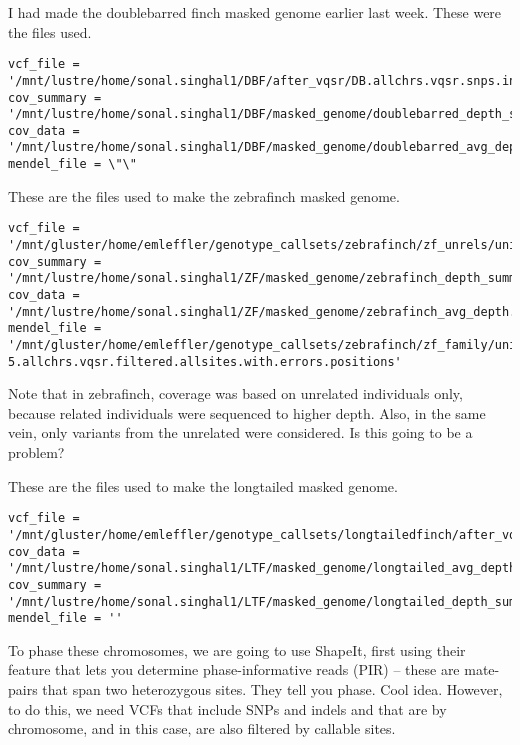\documentclass[idxtotoc,hyperref,openany,oneside]{labbook} %
\begin{document}
I had made the doublebarred finch masked genome earlier last week. These were the files used.
\begin{verbatim}
vcf_file = '/mnt/lustre/home/sonal.singhal1/DBF/after_vqsr/DB.allchrs.vqsr.snps.indels.vcf.gz'
cov_summary = '/mnt/lustre/home/sonal.singhal1/DBF/masked_genome/doublebarred_depth_summary.txt'
cov_data = '/mnt/lustre/home/sonal.singhal1/DBF/masked_genome/doublebarred_avg_depth.txt'
mendel_file = \"\"
\end{verbatim}

These are the files used to make the zebrafinch masked genome.
\begin{verbatim}
vcf_file = '/mnt/gluster/home/emleffler/genotype_callsets/zebrafinch/zf_unrels/unified_genotyper/after_vqsr/gatk.ug.unrelzf.allchrs.snps.indels.vqsr2.vcf.gz'
cov_summary = '/mnt/lustre/home/sonal.singhal1/ZF/masked_genome/zebrafinch_depth_summary.txt'
cov_data = '/mnt/lustre/home/sonal.singhal1/ZF/masked_genome/zebrafinch_avg_depth.txt'
mendel_file = '/mnt/gluster/home/emleffler/genotype_callsets/zebrafinch/zf_family/unified_genotyper/after_vqsr/mendelian_errors/gatk.ug.MP1-5.allchrs.vqsr.filtered.allsites.with.errors.positions'
\end{verbatim}
Note that in zebrafinch, coverage was based on unrelated individuals only, because related individuals were sequenced to higher depth. Also, in the same vein, only variants from the unrelated were considered. Is this going to be a problem?

These are the files used to make the longtailed masked genome.
\begin{verbatim}
vcf_file = '/mnt/gluster/home/emleffler/genotype_callsets/longtailedfinch/after_vqsr/gatk.ug.ltf.allchrs.snps.indels.vqsr2.vcf.gz'
cov_data = '/mnt/lustre/home/sonal.singhal1/LTF/masked_genome/longtailed_avg_depth.txt'
cov_summary = '/mnt/lustre/home/sonal.singhal1/LTF/masked_genome/longtailed_depth_summary.txt'
mendel_file = ''
\end{verbatim}

To phase these chromosomes, we are going to use ShapeIt, first using their feature that lets you determine phase-informative reads (PIR) -- these are mate-pairs that span two heterozygous sites. They tell you phase. Cool idea. However, to do this, we need VCFs that include SNPs and indels and that are by chromosome, and in this case, are also filtered by callable sites. \\
\end{document}
